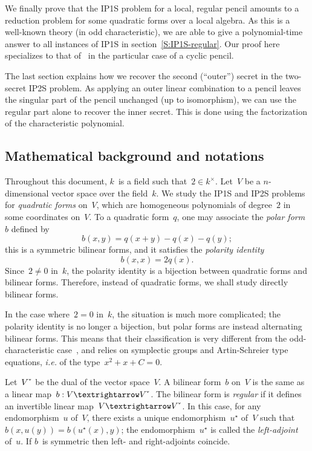 \documentclass{article}%
\def\chk#1{#1^{\smash{\scalebox{.7}[1.4]{\rotatebox{90}{\guilsinglleft}}}}}
\begin{document}
We finally prove that the IP1S problem for a local, regular pencil
amounts to a reduction problem for some quadratic forms over a local algebra.
As this is a well-known theory (in odd characteristic), we are able to
give a polynomial-time answer to all instances of IP1S in
section~\ref{S:IP1S-regular}. Our proof here specializes to that
of~\cite{MPG2013} in the particular case of a cyclic pencil.

The last section explains how we recover the second (``outer'') secret in
the two-secret IP2S problem. As applying an outer linear combination to a
pencil leaves the singular part of the pencil unchanged (up to
isomorphism), we can use the regular part alone to recover the inner
secret. This is done using the factorization of the characteristic
polynomial.

\subsection*{Mathematical background and notations}%
Throughout this document, $k$~is a field such that~$2 ∈ k^{×}$.
Let~$V$ be a $n$-dimensional vector space over the field~$k$. We study
the IP1S and IP2S problems for \emph{quadratic forms} on~$V$, which are
homogeneous polynomials of degree~$2$ in some coordinates on~$V$. To a
quadratic form~$q$, one may associate the \emph{polar form}~$b$ defined
by
\begin{equation*}\label{eq:polar}
b(x,y) = q(x+y) - q(x) - q(y);
\end{equation*}
this is a symmetric bilinear forms, and it satisfies the \emph{polarity
identity}
\begin{equation*}\label{eq:polarity}
b(x,x) = 2q(x).
\end{equation*}
Since~$2 ≠ 0$ in~$k$, the polarity identity is a bijection between
quadratic forms and bilinear forms. Therefore, instead of quadratic
forms, we shall study directly bilinear forms.

In the case where~$2 = 0$ in~$k$, the situation is much more complicated;
the polarity identity is no longer a bijection, but polar forms are
instead alternating bilinear forms. This means that their classification is
very different from the odd-characteristic case~\cite{milnorhusemoller},
and relies on symplectic groups and Artin-Schreier type equations,
\emph{i.e.} of the type~$x^2+x+C = 0$.

Let~$\chk{V}$ be the dual of the vector space~$V$. A bilinear form~$b$
on~$V$ is the same as a linear map~$b: V → \chk{V}$. The bilinear form is
\emph{regular} if it defines an invertible linear map~$V → \chk{V}$. In
this case, for any endomorphism~$u$ of~$V$, there exists a unique
endomorphism~$u^{⋆}$ of~$V$ such that~$b(x,u(y)) = b(u^{⋆}(x), y)$; the
endomorphism~$u^{⋆}$ is called the \emph{left-adjoint} of~$u$. If $b$~is
symmetric then left- and right-adjoints coincide.
\end{document}
